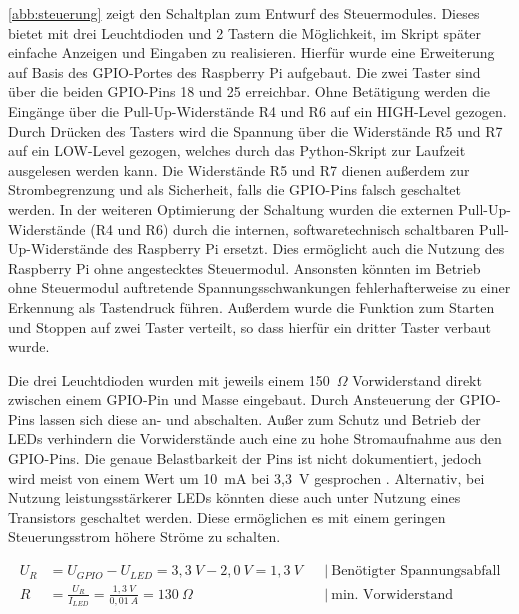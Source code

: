 \documentclass[a4paper,12pt,bibliography=totoc, listof=totoc,titlepage,pointlessnumbers]{scrreprt}
\begin{document}
\autoref{abb:steuerung} zeigt den Schaltplan zum Entwurf des Steuermodules. Dieses bietet mit drei Leuchtdioden und 2 Tastern die Mög\-lich\-keit, im Skript später einfache Anzeigen und Eingaben zu realisieren. Hierfür wurde eine Erweiterung auf Basis des GPIO-Portes des Rasp\-berry Pi aufgebaut. Die zwei Taster sind über die beiden GPIO-Pins 18 und 25 erreichbar. Ohne Betätigung werden die Eingänge über die Pull-Up-Widerstände R4 und R6 auf ein HIGH-Level gezogen. Durch Drücken des Tasters wird die Spannung über die Widerstände R5 und R7 auf ein LOW-Level gezogen, welches durch das Python-Skript zur Laufzeit ausgelesen werden kann. Die Widerstände R5 und R7 dienen außerdem zur Strombegrenzung und als Sicherheit, falls die GPIO-Pins falsch geschaltet werden.
In der weiteren Optimierung der Schaltung wurden die externen Pull-Up-Widerstände (R4 und R6) durch die internen, softwaretechnisch schaltbaren Pull-Up-Widerstände des Raspberry Pi ersetzt. Dies ermöglicht auch die Nutzung des Raspberry Pi ohne angestecktes Steuermodul. Ansonsten könnten im Betrieb ohne Steuermodul auftretende Spannungsschwankungen fehlerhafterweise zu einer Erkennung als Tastendruck füh\-ren. Außerdem wurde die Funktion zum Starten und Stoppen auf zwei Taster verteilt, so dass hierfür ein dritter Taster verbaut wurde.

Die drei Leuchtdioden wurden mit jeweils einem 150~$\Omega$ Vorwiderstand direkt zwischen einem GPIO-Pin und Masse eingebaut. Durch Ansteuerung der GPIO-Pins lassen sich diese an- und abschalten. Außer zum Schutz und Betrieb der LEDs verhindern die Vorwiderstände auch eine zu hohe Stromaufnahme aus den GPIO-Pins. Die genaue Belastbarkeit der Pins ist nicht dokumentiert, jedoch wird meist von einem Wert um 10~mA bei 3,3~V gesprochen \citep[zum Beispiel][]{ekRaspPin}. Alternativ, bei Nutzung leistungsstärkerer LEDs könnten diese auch unter Nutzung eines Transistors geschaltet werden. Diese ermöglichen es mit einem geringen Steuerungsstrom höhere Ströme zu schalten.

\begin{equation}
\begin{aligned}
U_R &= U_{GPIO} - U_{LED} = 3,3~V - 2,0~V = 1,3~V    && \left|\  \text{Benötigter Spannungsabfall} \right. \\
R &= \frac{U_R}{I_{LED}} = \frac{1,3~V}{0,01~A} = 130~\Omega   && \left|\  \text{min. Vorwiderstand} \right. \\
\end{aligned}
\label{eq:vorwiderstand}
\end{equation}
\end{document}
